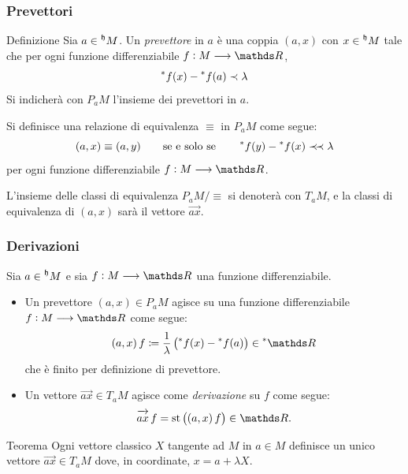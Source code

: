 \documentclass{beamer}
\newenvironment{definizioneb}{\begin{block}{Definizione}}{\end{block}}
\newenvironment{teoremab}{\begin{alertblock}{Teorema}}{\end{alertblock}}
\begin{document}
\begin{frame}
    \frametitle{Prevettori}

    \begin{definizioneb}
        Sia $ a \in \prescript{\mathfrak{h}}{}{M} $. Un \emph{prevettore} in $ a $ è una coppia $ (a,x) $ con $ x \in \prescript{\mathfrak{h}}{}{M} $ tale che per ogni funzione differenziabile $ f: M \longrightarrow \R $, \[
        \prescript{*}{}{f}(x)-\prescript{*}{}{f}(a)\prec \lambda
    \]Si indicherà con $ P_{a}M  $ l'insieme dei prevettori in $ a $.
    \end{definizioneb}

    Si definisce una relazione di equivalenza $ \equiv $ in $ P_{a}M  $ come segue: \[
        (a,x) \equiv (a,y) \qquad \text{se e solo se}\qquad \prescript{*}{}{f}(y)-\prescript{*}{}{f}(x)\mathrel{\prec\! \prec} \lambda
    \]per ogni funzione differenziabile $ f: M \longrightarrow \R $.

    L'insieme delle classi di equivalenza $ P_{a}M/\equiv  $ si denoterà con $ T_{a}M  $, e la classi di equivalenza di $ (a,x) $ sarà il vettore $ \vec{ax} $. 

\end{frame}


\begin{frame}
    \frametitle{Derivazioni}

        Sia $ a \in \prescript{\mathfrak{h}}{}{M} $ e sia $ f:M \longrightarrow \R $ una funzione differenziabile. \begin{itemize}
            \item Un prevettore $ (a,x) \in P_{a}M  $ agisce su una funzione differenziabile $ f: M \longrightarrow \R $ come segue: \[
                (a,x)\,f \coloneqq \frac{1}{\lambda}\left(\nonstandard{f}(x)-\nonstandard{f}(a)\right) \in \starR
            \]che è finito per definizione di prevettore.
            \item Un vettore $ \vec{ax} \in T_{a}M  $ agisce come \emph{derivazione} su $ f $ come segue: \[
                \vec{ax} \,f = \st\left((a,x)\,f\right) \in \R.
            \] 
        \end{itemize}
    
    \begin{teoremab}
        Ogni vettore classico $ X $ tangente ad $ M $ in $ a \in M$ definisce un unico vettore $ \vec{ax} \in T_{a} M  $ dove, in coordinate, $ x = a + \lambda X $.
    \end{teoremab}

\end{frame}
\end{document}
